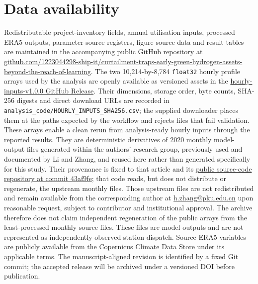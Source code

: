 \documentclass[11pt,a4paper]{article}
\begin{document}
\section*{Data availability}

Redistributable project-inventory fields, annual utilisation inputs, processed ERA5 outputs, parameter-source registers, figure source data and result tables are maintained in the accompanying public GitHub repository at \href{https://github.com/1223044298-ship-it/curtailment-traps-early-green-hydrogen-assets-beyond-the-reach-of-learning}{github.com/1223044298-ship-it/curtailment-traps-early-green-hydrogen-assets-beyond-the-reach-of-learning}. The two 10,214-by-8,784 \texttt{float32} hourly profile arrays used by the analysis are openly available as versioned assets in the \href{https://github.com/1223044298-ship-it/curtailment-traps-early-green-hydrogen-assets-beyond-the-reach-of-learning/releases/tag/hourly-inputs-v1.0.0}{hourly-inputs-v1.0.0 GitHub Release}. Their dimensions, storage order, byte counts, SHA-256 digests and direct download URLs are recorded in \texttt{analysis\_code/HOURLY\_INPUTS\_SHA256.csv}; the supplied downloader places them at the paths expected by the workflow and rejects files that fail validation. These arrays enable a clean rerun from analysis-ready hourly inputs through the reported results. They are deterministic derivatives of 2020 monthly model-output files generated within the authors' research group, previously used and documented by Li and Zhang\cite{li2026}, and reused here rather than generated specifically for this study. Their provenance is fixed to that article and its \href{https://github.com/Lynn20001130/-hydrogen-blending-analysis/tree/43af9fef041a7c55ca154cc6a40c5d339c23c521}{public source-code repository at commit 43af9fe}; that code reads, but does not distribute or regenerate, the upstream monthly files. Those upstream files are not redistributed and remain available from the corresponding author at \href{mailto:h.zhang@pku.edu.cn}{h.zhang@pku.edu.cn} upon reasonable request, subject to contributor and institutional approval. The archive therefore does not claim independent regeneration of the public arrays from the least-processed monthly source files. These files are model outputs and are not represented as independently observed station dispatch. Source ERA5 variables are publicly available from the Copernicus Climate Data Store under its applicable terms. The manuscript-aligned revision is identified by a fixed Git commit; the accepted release will be archived under a versioned DOI before publication.
\end{document}

